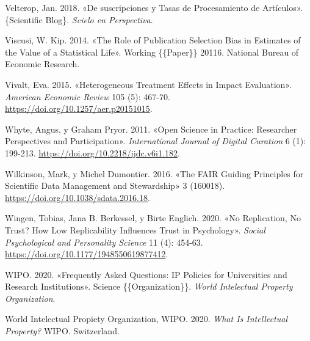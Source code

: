 \documentclass[
  spanish,
  a4paper,
  oneside]{scrbook}
\newlength{\cslhangindent}
\newenvironment{CSLReferences}[2] %
 {\begin{list}{}{%
  \setlength{\itemindent}{0pt}
  \setlength{\leftmargin}{0pt}
  \setlength{\parsep}{0pt}
  \ifodd #1
   \setlength{\leftmargin}{\cslhangindent}
   \setlength{\itemindent}{-1\cslhangindent}
  \fi
  \setlength{\itemsep}{#2\baselineskip}}}
 {\end{list}}
\begin{document}
\begin{CSLReferences}{1}{0}
Velterop, Jan. 2018. {«{De suscripciones y Tasas de Procesamiento de
Art{í}culos}»}. \{Scientific Blog\}. \emph{Scielo en Perspectiva}.

Viscusi, W. Kip. 2014. {«The {Role} of {Publication Selection Bias} in
{Estimates} of the {Value} of a {Statistical Life}»}. Working
\{\{Paper\}\} 20116. National Bureau of Economic Research.

Vivalt, Eva. 2015. {«Heterogeneous {Treatment Effects} in {Impact
Evaluation}»}. \emph{American Economic Review} 105 (5): 467-70.
\url{https://doi.org/10.1257/aer.p20151015}.

Whyte, Angus, y Graham Pryor. 2011. {«Open {Science} in {Practice}:
{Researcher Perspectives} and {Participation}»}. \emph{International
Journal of Digital Curation} 6 (1): 199-213.
\url{https://doi.org/10.2218/ijdc.v6i1.182}.

Wilkinson, Mark, y Michel Dumontier. 2016. {«The {FAIR Guiding
Principles} for Scientific Data Management and Stewardship»} 3 (160018).
\url{https://doi.org/10.1038/sdata.2016.18}.

Wingen, Tobias, Jana B. Berkessel, y Birte Englich. 2020. {«No
{Replication}, {No Trust}? {How Low Replicability Influences Trust} in
{Psychology}»}. \emph{Social Psychological and Personality Science} 11
(4): 454-63. \url{https://doi.org/10.1177/1948550619877412}.

WIPO. 2020. {«Frequently {Asked Questions}: {IP Policies} for
{Universities} and {Research Institutions}»}. Science
\{\{Organization\}\}. \emph{World Intelectual Property Organization}.

World Intelectual Propiety Organization, WIPO. 2020. \emph{What Is
Intellectual Property?} WIPO. Switzerland.

\end{CSLReferences}


\backmatter
\end{document}
